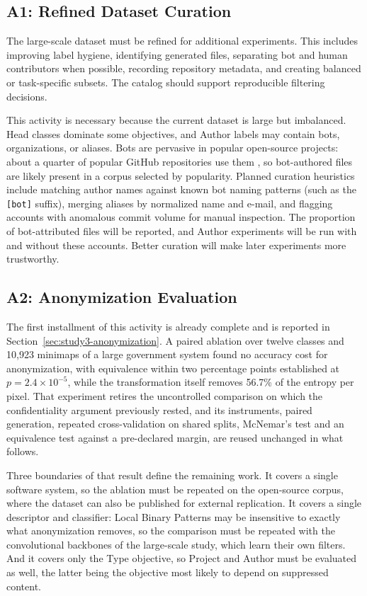 \subsection{A1: Refined Dataset Curation}

The large-scale dataset must be refined for additional experiments. This
includes improving label hygiene, identifying generated files, separating bot and
human contributors when possible, recording repository metadata, and creating
balanced or task-specific subsets. The catalog should support reproducible
filtering decisions.

This activity is necessary because the current dataset is large but imbalanced.
Head classes dominate some objectives, and Author labels may contain bots,
organizations, or aliases. Bots are pervasive in popular open-source projects:
about a quarter of popular GitHub repositories use them \cite{wessel2018power},
so bot-authored files are likely present in a corpus selected by popularity.
Planned curation heuristics include matching author names against known bot
naming patterns (such as the \texttt{[bot]} suffix), merging aliases by
normalized name and e-mail, and flagging accounts with anomalous commit volume
for manual inspection. The proportion of bot-attributed files will be reported,
and Author experiments will be run with and without these accounts. Better
curation will make later experiments more trustworthy.

\subsection{A2: Anonymization Evaluation}

The first installment of this activity is already complete and is reported in
Section~\ref{sec:study3-anonymization}. A paired ablation over twelve classes
and 10,923 minimaps of a large government system found no accuracy cost for
anonymization, with equivalence within two percentage points established at
$p = 2.4 \times 10^{-5}$, while the transformation itself removes 56.7\% of the
entropy per pixel. That experiment retires the uncontrolled comparison on which
the confidentiality argument previously rested, and its instruments, paired
generation, repeated cross-validation on shared splits, McNemar's test and an
equivalence test against a pre-declared margin, are reused unchanged in what
follows.

Three boundaries of that result define the remaining work. It covers a single
software system, so the ablation must be repeated on the open-source corpus,
where the dataset can also be published for external replication. It covers a
single descriptor and classifier: Local Binary Patterns may be insensitive to
exactly what anonymization removes, so the comparison must be repeated with the
convolutional backbones of the large-scale study, which learn their own filters.
And it covers only the Type objective, so Project and Author must be evaluated
as well, the latter being the objective most likely to depend on suppressed
content.

